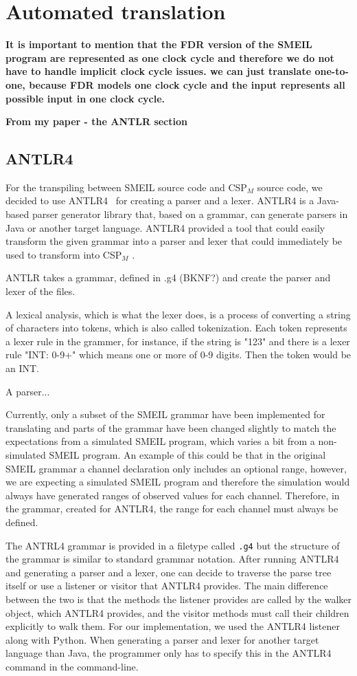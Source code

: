 \documentclass[a4paper]{report}
\newcommand{\cspm}{CSP$_M$ }
\begin{document}
\section{Automated translation}
 \textbf{It is important to mention that the FDR version of the SMEIL program are represented as one clock cycle and therefore we do not have to handle implicit clock cycle issues. we can just translate one-to-one, because FDR models one clock cycle and the input represents all possible input in one clock cycle.}

 \textbf{From my paper - the ANTLR section}
\subsection{ANTLR4}
For the transpiling between SMEIL source code and \cspm{} source code, we decided to use ANTLR4~\cite{antlr} for creating a parser and a lexer. ANTLR4 is a Java-based parser generator library that, based on a grammar, can generate parsers in Java or another target language. ANTLR4 provided a tool that could easily transform the given grammar into a parser and lexer that could immediately be used to transform into \cspm{}.

ANTLR takes a grammar, defined in .g4 (BKNF?) and create the parser and lexer of the files.

A lexical analysis, which is what the lexer does, is a process of converting a string of characters into tokens, which is also called tokenization. Each token represents a lexer rule in the grammer, for instance, if the string is "123" and there is a lexer rule "INT: {0-9}+" which means one or more of 0-9 digits. Then the token would be an INT.

A parser...

Currently, only a subset of the SMEIL grammar have been implemented for translating and parts of the grammar have been changed slightly to match the expectations from a simulated SMEIL program, which varies a bit from a non-simulated SMEIL program. An example of this could be that in the original SMEIL grammar a channel declaration only includes an optional range, however, we are expecting a simulated SMEIL program and therefore the simulation would always have generated ranges of observed values for each channel. Therefore, in the grammar, created for ANTLR4, the range for each channel must always be defined.

The ANTRL4 grammar is provided in a filetype called \texttt{.g4} but the structure of the grammar is similar to standard grammar notation.
After running ANTLR4 and generating a parser and a lexer, one can decide to traverse the parse tree itself or use a listener or visitor that ANTLR4 provides. The main difference between the two is that the methods the listener provides are called by the walker object, which ANTLR4 provides, and the visitor methods must call their children explicitly to walk them.
For our implementation, we used the ANTLR4 listener along with Python. When generating a parser and lexer for another target language than Java, the programmer only has to specify this in the ANTLR4 command in the command-line.
\end{document}
